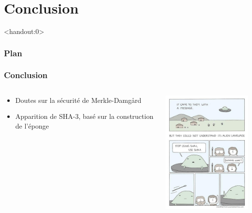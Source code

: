 \section{Conclusion}
\begin{frame}<handout:0>
  \frametitle{Plan}
  \tableofcontents[currentsection,subsectionstyle=hide]
\end{frame}

\begin{frame}[fragile]
  \frametitle{Conclusion}

  \begin{minipage}[0.2\textheight]{\textwidth}
    \begin{columns}[T]
      \begin{column}{0.5\textwidth}
        \vspace{2cm}
        \begin{itemize}
        \item{Doutes sur la sécurité de Merkle-Damg\r{a}rd}
          \vspace{1.5cm}
        \item{Apparition de SHA-3, basé sur la construction de l'éponge}
          \vfill
        \end{itemize}
        \vfill
      \end{column}
      \begin{column}{0.5\textwidth}
        \includegraphics[width=5.5cm]{Conclu-Memoire.jpg}
      \end{column}
      \end{columns}
      \end{minipage}
  \vfill
\end{frame}
